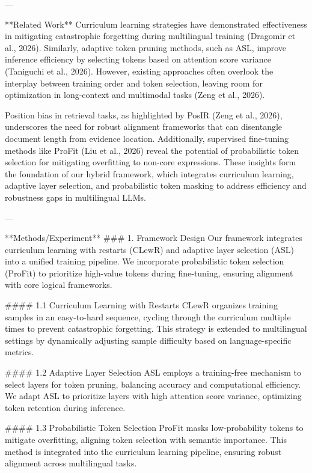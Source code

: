 ---

**Related Work**  
Curriculum learning strategies have demonstrated effectiveness in mitigating catastrophic forgetting during multilingual training (Dragomir et al., 2026). Similarly, adaptive token pruning methods, such as ASL, improve inference efficiency by selecting tokens based on attention score variance (Taniguchi et al., 2026). However, existing approaches often overlook the interplay between training order and token selection, leaving room for optimization in long-context and multimodal tasks (Zeng et al., 2026).

Position bias in retrieval tasks, as highlighted by PosIR (Zeng et al., 2026), underscores the need for robust alignment frameworks that can disentangle document length from evidence location. Additionally, supervised fine-tuning methods like ProFit (Liu et al., 2026) reveal the potential of probabilistic token selection for mitigating overfitting to non-core expressions. These insights form the foundation of our hybrid framework, which integrates curriculum learning, adaptive layer selection, and probabilistic token masking to address efficiency and robustness gaps in multilingual LLMs.

---

**Methods/Experiment**  
### 1. Framework Design  
Our framework integrates curriculum learning with restarts (CLewR) and adaptive layer selection (ASL) into a unified training pipeline. We incorporate probabilistic token selection (ProFit) to prioritize high-value tokens during fine-tuning, ensuring alignment with core logical frameworks.

#### 1.1 Curriculum Learning with Restarts  
CLewR organizes training samples in an easy-to-hard sequence, cycling through the curriculum multiple times to prevent catastrophic forgetting. This strategy is extended to multilingual settings by dynamically adjusting sample difficulty based on language-specific metrics.

#### 1.2 Adaptive Layer Selection  
ASL employs a training-free mechanism to select layers for token pruning, balancing accuracy and computational efficiency. We adapt ASL to prioritize layers with high attention score variance, optimizing token retention during inference.

#### 1.3 Probabilistic Token Selection  
ProFit masks low-probability tokens to mitigate overfitting, aligning token selection with semantic importance. This method is integrated into the curriculum learning pipeline, ensuring robust alignment across multilingual tasks.

